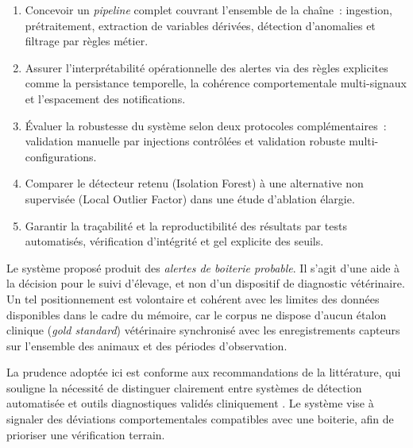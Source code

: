 \begin{introduction}
\begin{enumerate}
  \item Concevoir un \textit{pipeline} complet couvrant l'ensemble de la chaîne~:
  ingestion, prétraitement, extraction de variables dérivées, détection d'anomalies et
  filtrage par règles métier.
  \item Assurer l'interprétabilité opérationnelle des alertes via des règles explicites
  comme la persistance temporelle, la cohérence comportementale multi-signaux et
  l'espacement des notifications.
  \item Évaluer la robustesse du système selon deux protocoles complémentaires~:
  validation manuelle par injections contrôlées et validation robuste
  multi-configurations.
  \item Comparer le détecteur retenu (Isolation Forest) à une alternative non
  supervisée (Local Outlier Factor) dans une étude d'ablation élargie.
  \item Garantir la traçabilité et la reproductibilité des résultats par tests automatisés,
  vérification d'intégrité et gel explicite des seuils.
\end{enumerate}

Le système proposé produit des \textit{alertes de boiterie probable}. Il s'agit d'une aide
à la décision pour le suivi d'élevage, et non d'un dispositif de diagnostic vétérinaire.
Un tel positionnement est volontaire et cohérent avec les limites des données disponibles
dans le cadre du mémoire, car le corpus ne dispose d'aucun étalon clinique
(\textit{gold standard}) vétérinaire synchronisé avec les enregistrements capteurs sur
l'ensemble des animaux et des périodes d'observation.

La prudence adoptée ici est conforme aux recommandations de la littérature, qui souligne la nécessité
de distinguer clairement entre systèmes de détection automatisée et outils diagnostiques
validés cliniquement \citep{alsaaod2019automatic}. Le système vise à signaler des déviations
comportementales compatibles avec une boiterie, afin de prioriser une vérification terrain.


\end{introduction}

